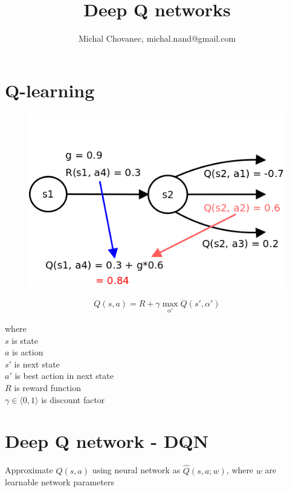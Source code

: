 \documentclass[10pt,a4paper]{article}
\begin{document}
\title{Deep Q networks}
\author{Michal Chovanec, michal.nand@gmail.com}
\date{}
\maketitle
\thispagestyle{empty}

\section{Q-learning}


\begin{figure}[!htb]
  \centering
  \includegraphics[scale=0.3]{../../diagrams/q_learning_detail.png}
\end{figure}

\begin{align}
Q(s, a) = R + \gamma \max \limits_{\alpha'} Q(s', \alpha')
\label{eq:q_learning}
\end{align}

where \\
$s$ is state \\
$a$ is action \\
$s'$ is next state \\
$a'$ is best action in next state \\
$R$ is reward function \\
$\gamma \in \langle 0, 1 \rangle$ is discount factor \\


\section{Deep Q network - DQN}

Approximate $Q(s, a)$ using neural network as $\hat{Q}(s, a; w)$, where $w$ are learnable network
parameters
\end{document}
